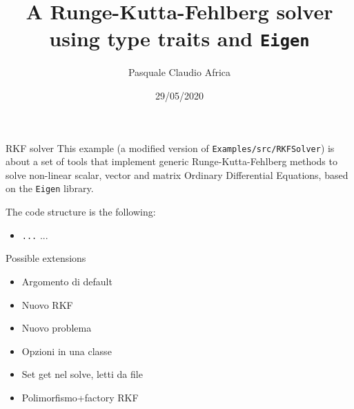 \documentclass[10pt]{beamer}
\begin{document}
    \title{A Runge-Kutta-Fehlberg solver\protect\\ using type traits and \texttt{Eigen}}
    \author{Pasquale Claudio Africa}
    \date{29/05/2020}

\begin{frame}
    \maketitle
\end{frame}

\begin{frame}{RKF solver}
This example (a modified version of \texttt{Examples/src/RKFSolver}) is about a set of tools that implement generic Runge-Kutta-Fehlberg methods to solve non-linear scalar, vector and matrix Ordinary Differential Equations, based on the \texttt{Eigen} library.

The code structure is the following:
\begin{itemize}
\item \texttt{...} ...
\end{itemize}
\end{frame}

\begin{frame}{Possible extensions}
\begin{itemize}
\item Argomento di default
\item Nuovo RKF
\item Nuovo problema

\item Opzioni in una classe
\item Set get nel solve, letti da file

\item Polimorfismo+factory RKF
\end{itemize}
\end{frame}
\end{document}
